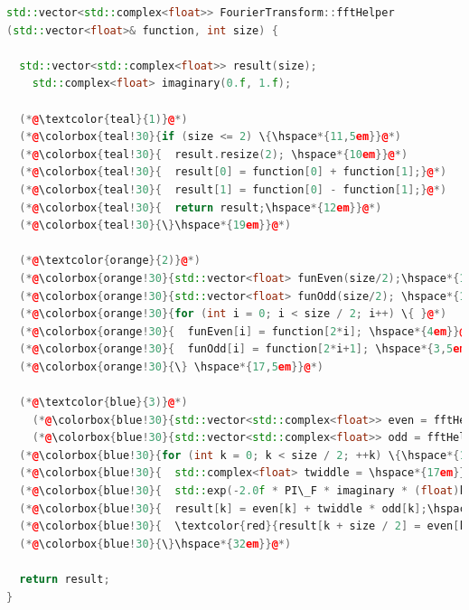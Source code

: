 \documentclass[a4paper,12pt]{article}
\theoremstyle{definition}
\theoremstyle{remark}
\begin{document}
\begin{lstlisting}[style=mystyle, language=C++, caption={Funktion fastFourierTransform}]
std::vector<std::complex<float>> FourierTransform::fftHelper
(std::vector<float>& function, int size) {

  std::vector<std::complex<float>> result(size);
	std::complex<float> imaginary(0.f, 1.f);

  (*@\textcolor{teal}{1)}@*)
  (*@\colorbox{teal!30}{if (size <= 2) \{\hspace*{11,5em}}@*)
  (*@\colorbox{teal!30}{  result.resize(2); \hspace*{10em}}@*)
  (*@\colorbox{teal!30}{  result[0] = function[0] + function[1];}@*)
  (*@\colorbox{teal!30}{  result[1] = function[0] - function[1];}@*)
  (*@\colorbox{teal!30}{  return result;\hspace*{12em}}@*)
  (*@\colorbox{teal!30}{\}\hspace*{19em}}@*)

  (*@\textcolor{orange}{2)}@*)
  (*@\colorbox{orange!30}{std::vector<float> funEven(size/2);\hspace*{1em}}@*)
  (*@\colorbox{orange!30}{std::vector<float> funOdd(size/2); \hspace*{1em}}@*)
  (*@\colorbox{orange!30}{for (int i = 0; i < size / 2; i++) \{ }@*)
  (*@\colorbox{orange!30}{  funEven[i] = function[2*i]; \hspace*{4em}}@*)
  (*@\colorbox{orange!30}{  funOdd[i] = function[2*i+1]; \hspace*{3,5em}}@*)
  (*@\colorbox{orange!30}{\} \hspace*{17,5em}}@*)

  (*@\textcolor{blue}{3)}@*)
	(*@\colorbox{blue!30}{std::vector<std::complex<float>> even = fftHelper(funEven,size/2);}@*)
	(*@\colorbox{blue!30}{std::vector<std::complex<float>> odd = fftHelper(funOdd, size/2);\hspace*{0,5em}}@*)
  (*@\colorbox{blue!30}{for (int k = 0; k < size / 2; ++k) \{\hspace*{14,5em}}@*)
  (*@\colorbox{blue!30}{  std::complex<float> twiddle = \hspace*{17em}}@*)
  (*@\colorbox{blue!30}{  std::exp(-2.0f * PI\_F * imaginary * (float)k / (float)size);\hspace*{2em}}@*)
  (*@\colorbox{blue!30}{  result[k] = even[k] + twiddle * odd[k];\hspace*{12,5em}}@*)
  (*@\colorbox{blue!30}{  \textcolor{red}{result[k + size / 2] = even[k] - twiddle * odd[k];}\hspace{7em}}@*)
  (*@\colorbox{blue!30}{\}\hspace*{32em}}@*)

  return result;
}
\end{lstlisting}
\end{document}
